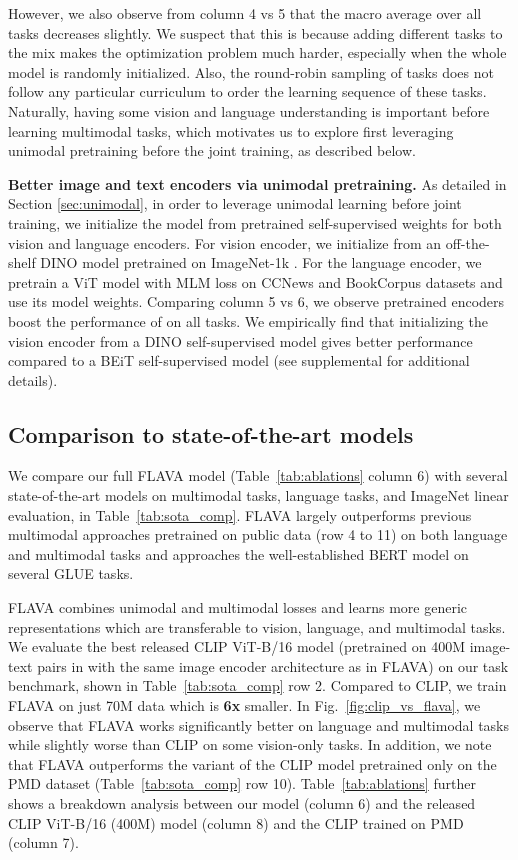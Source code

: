 \documentclass[10pt,twocolumn,letterpaper]{article}
\newcommand{\myparagraph}[1]{\vspace{0.25em}\noindent\textbf{#1}}
\begin{document}
However, we also observe from column 4 vs 5 that the macro average over all tasks decreases slightly. We suspect that this is because adding different tasks to the mix makes the optimization problem much harder, especially when the whole model is randomly initialized. Also, the round-robin sampling of tasks does not follow any particular curriculum to order the learning sequence of these tasks. Naturally, having some vision and language understanding is important before learning multimodal tasks, which motivates us to explore first leveraging unimodal pretraining before the joint training, as described below.

\myparagraph{Better image and text encoders via unimodal pretraining.} As detailed in Section \ref{sec:unimodal}, in order to leverage unimodal learning before joint training, we initialize the model from pretrained self-supervised weights for both vision and language encoders. For vision encoder, we initialize from an off-the-shelf DINO model pretrained on ImageNet-1k \cite{imagenet}. For the language encoder, we pretrain a ViT model with MLM loss on CCNews and BookCorpus datasets and use its model weights. Comparing column 5 vs 6, we observe pretrained encoders boost the performance of  on all tasks. We empirically find that initializing the vision encoder from a DINO self-supervised model gives better performance compared to a BEiT self-supervised model (see supplemental for additional details).

\subsection{Comparison to state-of-the-art models}
\label{sec:compare_sota}

We compare our full FLAVA model (Table~\ref{tab:ablations} column 6) with several state-of-the-art models on multimodal tasks, language tasks, and ImageNet linear evaluation, in Table~\ref{tab:sota_comp}. FLAVA largely outperforms previous multimodal approaches pretrained on public data (row 4 to 11) on both language and multimodal tasks and approaches the well-established BERT model on several GLUE tasks.

FLAVA combines unimodal and multimodal losses and learns more generic representations which are transferable to vision, language, and multimodal tasks.  We evaluate the best released CLIP \cite{radford2021learning} ViT-B/16 model (pretrained on 400M image-text pairs in \cite{radford2021learning} with the same image encoder architecture as in FLAVA) on our task benchmark, shown in Table~\ref{tab:sota_comp} row 2. Compared to CLIP, we train FLAVA on just 70M data which is \textbf{6x} smaller. In Fig.~\ref{fig:clip_vs_flava}, we observe that FLAVA works significantly better on language and multimodal tasks while slightly worse than CLIP on some vision-only tasks. In addition, we note that FLAVA outperforms the variant of the CLIP model pretrained only on the PMD dataset (Table~\ref{tab:sota_comp} row 10). Table~\ref{tab:ablations} further shows a breakdown analysis between our model (column 6) and the released CLIP ViT-B/16 (400M) model (column 8) and the CLIP trained on PMD (column 7).
\end{document}
